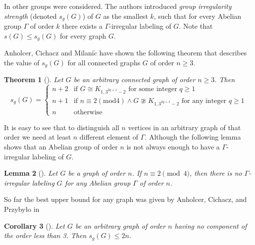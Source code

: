 \documentclass{article}
\newtheorem{thm}{Theorem}[section]
\newtheorem{lem}[thm]{Lemma}
\newtheorem{cor}[thm]{Corollary}
\begin{document}
In \cite{ref_AnhCic1} other groups were considered. The authors introduced \textit{group irregularity strength} (denoted $s_g(G)$) of $G$ as the smallest $k$, such that for every Abelian group $\Gamma$ of order $k$ there exists a $\Gamma$-irregular labeling of $G$. Note that $s(G)\leq s_g(G)$ for every graph $G$.


Anholcer, Cichacz and Milani$\check{c}$ have shown the following theorem that describes the value of $s_g(G)$ for all connected graphs $G$ of order $n\geq 3$. 
\begin{thm}[\cite{ref_AnhCic1}]\label{Anh}
    Let $G$ be an arbitrary connected graph of order $n\geq 3$. Then
    $$s_g(G) = \left\{\begin{matrix}
        n+2 & \text{if } G\cong K_{1,3^{2q+1}-2} \text{ for some integer } q\geq 1\\ 
        n+1 & \text{if } n\equiv 2 (\text{mod} 4) \wedge G\ncong K_{1,3^{2q+1}-2} \text{ for any integer } q\geq 1 \\ 
        n & \text{otherwise} 
    \end{matrix}\right.$$
\end{thm}
It is easy to see that to distinguish all $n$ vertices in an arbitrary graph of that order we need at least $n$ different element of $\Gamma$.
Although the following lemma shows that an Abelian group of order $n$ is not always enough to have a $\Gamma$-irregular labeling of $G$.
\begin{lem}[\cite{ref_AnhCic1}]\label{2mod4}
    Let $G$ be a graph of order $n$.
    If $n\equiv 2 \pmod4$, then there is no $\Gamma$-irregular labeling $G$ for any Abelian group $\Gamma$ of order $n$.
\end{lem}
So far the best upper bound for any graph was given by Anholcer, Cichacz, and Przybyło in \cite{LinearBoundNo0}
\begin{cor}[\cite{LinearBoundNo0}]\label{linear}
    Let $G$ be an arbitrary graph of order $n$ having no component of the order less than 3. 
    Then  $s_g(G) \leq 2n.$
\end{cor}
\end{document}
